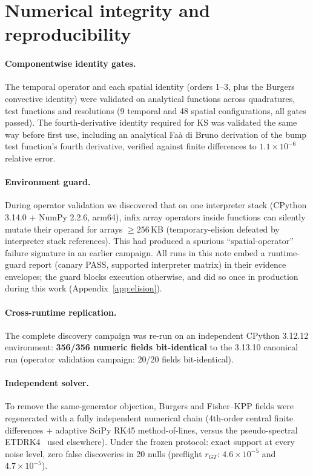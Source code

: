 \documentclass[11pt]{article}
\begin{document}
\section{Numerical integrity and reproducibility}
\label{sec:integrity}
\paragraph{Componentwise identity gates.} The temporal operator and each
spatial identity (orders 1--3, plus the Burgers convective identity) were
validated on analytical functions across quadratures, test functions and
resolutions (9 temporal and 48 spatial configurations, all
gates passed). The fourth-derivative identity required for KS was validated
the same way before first use, including an analytical Fa\`a di Bruno
derivation of the bump test function's fourth derivative, verified against
finite differences to $1.1 \times 10^{-6}$ relative error.

\paragraph{Environment guard.} During operator validation we discovered that
on one interpreter stack (CPython 3.14.0 + NumPy 2.2.6, arm64), infix array
operators inside functions can silently mutate their operand for arrays
$\geq 256$\,KB (temporary-elision defeated by interpreter stack references).
This had produced a spurious ``spatial-operator'' failure signature in an
earlier campaign. All runs in this note embed a runtime-guard report (canary
PASS, supported interpreter matrix) in their evidence envelopes; the guard
blocks execution otherwise, and did so once in production during this work
(Appendix~\ref{app:elision}).

\paragraph{Cross-runtime replication.} The complete discovery campaign was
re-run on an independent CPython 3.12.12 environment:
\textbf{356/356 numeric fields bit-identical} to the 3.13.10
canonical run (operator validation campaign: 20/20 fields
bit-identical).

\paragraph{Independent solver.} To remove the same-generator objection,
Burgers and Fisher--KPP fields were regenerated with a fully independent
numerical chain (4th-order central finite differences + adaptive SciPy RK45
method-of-lines, versus the pseudo-spectral ETDRK4~\cite{kassam2005} used elsewhere). Under
the frozen protocol: exact support at every noise level, zero false
discoveries in 20 nulls (preflight $r_{GT}$: $4.6 \times 10^{-5}$ and
$4.7 \times 10^{-5}$).
\end{document}
